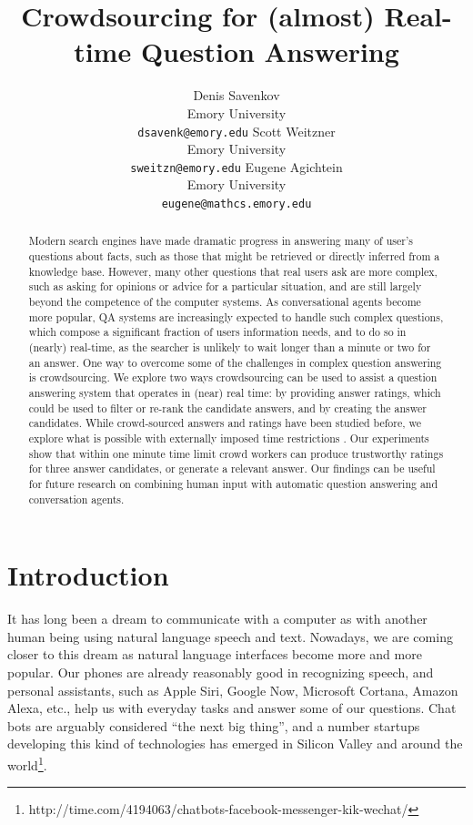 \documentclass[11pt,letterpaper]{article}
\title{Crowdsourcing for (almost) Real-time Question Answering}
\author{Denis Savenkov \\ Emory University \\ {\tt dsavenk@emory.edu} 
  \And Scott Weitzner \\ Emory University \\ {\tt sweitzn@emory.edu}
  \And Eugene Agichtein \\ Emory University \\ {\tt eugene@mathcs.emory.edu}
}
\date{}
\begin{document}
\maketitle

\begin{abstract}

Modern search engines have made dramatic progress in answering many of user's questions about facts, such as those that might be retrieved or directly inferred from a knowledge base. However, many other questions that real users ask are more complex, such as asking for opinions or advice for a particular situation, and are still largely beyond the competence of the computer systems.
As conversational agents become more popular, QA systems are increasingly expected to handle such complex questions, which compose a significant fraction of users information needs, and to do so in (nearly) real-time, as the searcher is unlikely to wait longer than a minute or two for an answer.
One way to overcome some of the challenges in complex question answering is crowdsourcing.
We explore two ways crowdsourcing can be used to assist a question answering system that operates in (near) real time: by providing answer ratings, which could be used to filter or re-rank the candidate answers, and by creating the answer candidates. While crowd-sourced answers and ratings have been studied before, we explore what is possible with externally imposed time restrictions . 
Our experiments show that within one minute time limit crowd workers can produce trustworthy ratings for three answer candidates, or generate a relevant answer.
Our findings can be useful for future research on combining human input with automatic question answering and conversation agents.

\end{abstract}

\section{Introduction}
\label{sec:introduction}

It has long been a dream to communicate with a computer as with another human being using natural language speech and text.
Nowadays, we are coming closer to this dream as natural language interfaces become more and more popular.
Our phones are already reasonably good in recognizing speech, and personal assistants, such as Apple Siri, Google Now, Microsoft Cortana, Amazon Alexa, etc., help us with everyday tasks and answer some of our questions.
Chat bots are arguably considered ``the next big thing'', and a number startups developing this kind of technologies has emerged in Silicon Valley and around the world\footnote{http://time.com/4194063/chatbots-facebook-messenger-kik-wechat/}.
\end{document}
